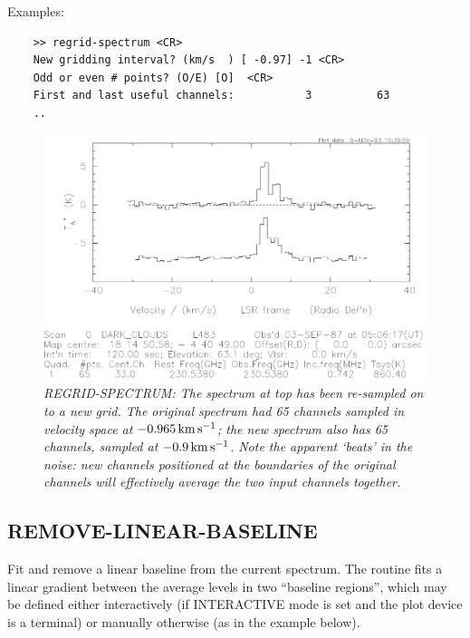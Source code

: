 \documentclass[11pt,twoside]{report}
\newcommand{\kms}{{\rm\,km\,s^{-1}}}
\begin{document}
Examples:
\begin{verbatim}
    >> regrid-spectrum <CR>
    New gridding interval? (km/s  ) [ -0.97] -1 <CR>
    Odd or even # points? (O/E) [O]  <CR>
    First and last useful channels:           3          63
    ..
\end{verbatim}

\begin{figure}[htbp]
\begin{center}
\includegraphics[scale=0.65]{regrid}
\protect\parbox{5.5in}
{\caption[REGRID]
{\sl
REGRID-SPECTRUM: The spectrum at top has been re-sampled on to a new grid. The
original spectrum had 65 channels sampled in velocity space at $-0.965 \kms$;
the new spectrum also has 65 channels, sampled at $-0.9\kms$. Note the
apparent `beats' in the noise: new channels positioned at the boundaries of
the original channels will effectively average the two input channels together.
\label{REGRID}
}
}
\end{center}
\end{figure}

\subsection{REMOVE-LINEAR-BASELINE} 

Fit and remove a linear baseline from the current spectrum. The routine
fits a linear gradient between the average levels in two ``baseline regions'',
which may be defined either interactively (if INTERACTIVE mode is set and the
plot device is a terminal) or manually otherwise (as in the example below).
\end{document}
